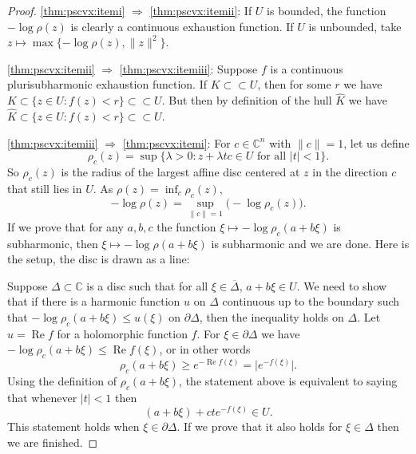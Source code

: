 \documentclass[12pt,openany]{book}
\renewcommand{\Re}{\operatorname{Re}}
\newcommand{\sabs}[1]{\lvert {#1} \rvert}
\newcommand{\snorm}[1]{\lVert {#1} \rVert}
\newcommand{\babs}[1]{\bigl\lvert {#1} \bigr\rvert}
\newcommand{\C}{{\mathbb{C}}}
\newcommand{\D}{{\mathbb{D}}}
\theoremstyle{plain}
\theoremstyle{remark}
\theoremstyle{definition}
\theoremstyle{exercise}
\theoremstyle{example}
\begin{document}
\begin{proof}
\eqref{thm:pscvx:itemi}
$\Rightarrow$
\eqref{thm:pscvx:itemii}:
If $U$ is bounded,
the function $-\log \rho(z)$ is clearly a continuous exhaustion function.
If $U$ is unbounded, take 
$z \mapsto \max \{ -\log \rho(z) , \snorm{z}^2 \}$.

\eqref{thm:pscvx:itemii}
$\Rightarrow$
\eqref{thm:pscvx:itemiii}:
Suppose $f$ is a continuous plurisubharmonic exhaustion function.
If $K \subset \subset U$, then for some $r$ we have
$K \subset \{ z \in U : f(z) < r \} \subset \subset U$.
But then by definition of the hull $\widehat{K}$ we have
$\widehat{K} \subset \{ z \in U : f(z) < r \} \subset \subset U$.

\eqref{thm:pscvx:itemiii}
$\Rightarrow$
\eqref{thm:pscvx:itemi}:
For $c \in \C^n$ with $\snorm{c}=1$, let us define
\begin{equation*}
\rho_c(z) =
\sup \{ \lambda > 0 : z+ \lambda t c \in U \text{ for all $\sabs{t} <
1$} \} .
\end{equation*}
So $\rho_c(z)$ is the radius of the largest affine disc centered at $z$
in the direction $c$ that still lies in $U$.
As $\rho(z) = \inf_c \rho_c(z)$,
\begin{equation*}
- \log \rho(z) = \sup_{\snorm{c}=1} \bigl(-\log \rho_c(z)\bigr) .
\end{equation*}
If we prove that for any $a, b, c$ the function $\xi \mapsto -\log \rho_c(a+b\xi)$ is
subharmonic, then $\xi \mapsto - \log \rho(a+b\xi)$ is subharmonic and we are done.
Here is the setup, the disc is drawn as a line:

\begin{center}

\end{center}

Suppose $\Delta \subset \C$ is a disc such that for all $\xi \in
\overline{\Delta}$, $a+b\xi \in U$.  We need to show that if there is a
harmonic function $u$ on $\Delta$ continuous up to the boundary such
that $- \log \rho_c(a+b\xi) \leq u(\xi)$ on $\partial \Delta$, then
the inequality holds on $\Delta$.  Let $u = \Re f$ for a holomorphic
function $f$.
For $\xi \in \partial \Delta$ we have  $- \log \rho_c(a+b\xi) \leq \Re
f(\xi)$,
or in other words
\begin{equation*}
\rho_c(a+b\xi) \geq e^{-\Re f(\xi)} = \babs{e^{-f(\xi)}}.
\end{equation*}
Using the definition of $\rho_c(a+b\xi)$, the statement above is equivalent
to saying that whenever $\sabs{t} < 1$ then 
\begin{equation*}
(a+b\xi)+cte^{-f(\xi)} \in U .
\end{equation*}
This statement holds when $\xi \in \partial \Delta$.  If we prove that it also
holds for $\xi \in \Delta$ then we are finished.


\end{proof}
\end{document}
